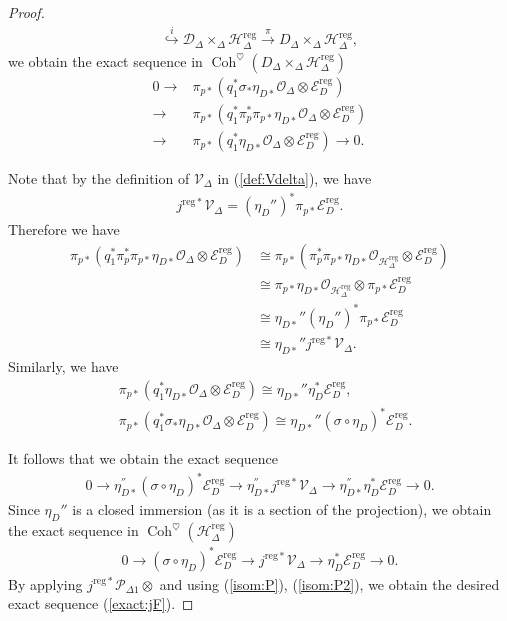 \documentclass[11pt,oneside,a4paper,mathscr]{amsart}
\theoremstyle{definition}
\newcommand{\cH}{\mathcal{H}}
\newcommand{\cP}{\mathcal{P}}
\newcommand{\cE}{\mathcal{E}}
\newcommand{\cD}{\mathcal{D}}
\newcommand{\Coh}{\operatorname{Coh}}
\begin{document}
\begin{proof}
\begin{align*}
    \stackrel{i}{\hookrightarrow} \cD_{\Delta}\times_{\Delta}\cH_{\Delta}^{\mathrm{reg}} \stackrel{\pi}{\to} D_{\Delta}\times_{\Delta}\cH_{\Delta}^{\mathrm{reg}},
\end{align*}
we obtain 
the exact sequence in $\Coh^{\heartsuit}(D_{\Delta}\times_{\Delta}\cH_{\Delta}^{\mathrm{reg}})$
\begin{align*}
0\to {}&
\pi_{p*}(q_1^*\sigma_{*}\eta_{D*}\mathcal{O}_{\Delta}
\otimes \cE^{\mathrm{reg}}_{D}) \\
\to {}&
\pi_{p*}(q_1^*\pi_p^* \pi_{p*}\eta_{D*}\mathcal{O}_{\Delta}
\otimes \cE^{\mathrm{reg}}_{D}) \\
\to {}&
\pi_{p*}(q_1^*\eta_{D*}\mathcal{O}_{\Delta}
\otimes \cE^{\mathrm{reg}}_{D}) \to 0. 
\end{align*}

Note that by the definition of $\mathcal{V}_{\Delta}$ in (\ref{def:Vdelta}), we have 
\begin{align*}
    j^{\mathrm{reg}*}\mathcal{V}_{\Delta}=(\eta_D'')^* \pi_{p*}\cE^{\mathrm{reg}}_{D}.
\end{align*}
Therefore we have 
\begin{align*}
    \pi_{p*}(q_1^*\pi_p^* \pi_{p*}\eta_{D*}\mathcal{O}_{\Delta}\otimes \cE^{\mathrm{reg}}_{D})  &\cong \pi_{p*}(\pi_p^* \pi_{p*}\eta_{D*}\mathcal{O}_{\cH_{\Delta}^{\mathrm{reg}}}\otimes \cE^{\mathrm{reg}}_{D}) \\
    &\cong \pi_{p*}\eta_{D*}\mathcal{O}_{\cH_{\Delta}^{\mathrm{reg}}}\otimes \pi_{p*}\cE^{\mathrm{reg}}_{D}\\
    &\cong \eta_{D*}''(\eta_D'')^*\pi_{p*}\cE^{\mathrm{reg}}_{D} \\
    &\cong \eta_{D*}''j^{\mathrm{reg}*}\mathcal{V}_{\Delta}.
\end{align*}
Similarly, we have 
\begin{align*}
   &\pi_{p*}(q_1^*\eta_{D*}\mathcal{O}_{\Delta}\otimes \cE^{\mathrm{reg}}_{D}) \cong \eta_{D*}''\eta_D^* \cE^{\mathrm{reg}}_{D}, \\
   & \pi_{p*}(q_1^*\sigma_*\eta_{D*}\mathcal{O}_{\Delta}\otimes \cE^{\mathrm{reg}}_{D}) \cong \eta_{D*}''(\sigma \circ \eta_D)^* \cE^{\mathrm{reg}}_{D}.
\end{align*} 

It follows that we obtain the exact sequence 
\begin{align*}
    0\to \eta^{''}_{D*}(\sigma \circ \eta_D)^* \cE^{\mathrm{reg}}_{D} \to \eta^{''}_{D*}j^{\mathrm{reg}*}\mathcal{V}_{\Delta}\to \eta^{''}_{D*}\eta_D^{*}\cE^{\mathrm{reg}}_{D} \to 0.
\end{align*}
Since $\eta_D''$ is a closed immersion (as it is a section of the projection),
we obtain the exact sequence in $\Coh^{\heartsuit}(\cH_{\Delta}^{\mathrm{reg}})$
\begin{align*}
     0\to (\sigma \circ \eta_D)^* \cE^{\mathrm{reg}}_{D} \to j^{\mathrm{reg}*}\mathcal{V}_{\Delta}\to \eta_D^{*}\cE^{\mathrm{reg}}_{D}\to 0.
\end{align*}
By applying $j^{\mathrm{reg}*}\cP_{\Delta 1} \otimes$ and using (\ref{isom:P}), (\ref{isom:P2}), we
obtain the desired exact sequence (\ref{exact:jF}). 
\end{proof}
\end{document}
